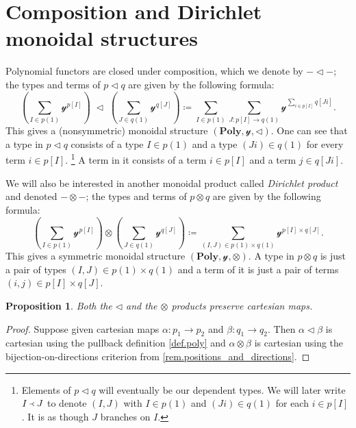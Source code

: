 \documentclass[11pt, one side, article]{memoir}
\theoremstyle{definition}
\theoremstyle{plain}
\newtheorem{proposition}[definitionx]{Proposition}
\newcommand{\Cat}[1]{\mathbf{#1}}%
\newcommand{\yon}{\mathcal{y}}
\newcommand{\poly}{\Cat{Poly}}
\newcommand{\0}{\textsf{0}}
\newcommand{\1}{\tn{\textsf{1}}}
\newcommand{\tri}{\mathbin{\triangleleft}}
\newcommand{\founds}{\Yleft}
\begin{document}
\section{Composition and Dirichlet monoidal structures}

Polynomial functors are closed under composition, which we denote by $-\tri-$; the types and terms of $p\tri q$ are given by the following formula:
\begin{equation}\label{eqn.comp_formula}
  \left(\sum_{I\in p(1)}\yon^{p[I]}\right)\;\tri\;
  \left(\sum_{J\in q(1)}\yon^{q[J]}\right)\coloneqq
  \sum_{I\in p(1)}\sum_{J\colon p[I]\to q(1)}\yon^{\sum_{i\in p[I]}q[J i]}.
\end{equation}
This gives a (nonsymmetric) monoidal structure $(\poly,\yon,\tri)$. One can see that a type in $p\tri q$ consists of a type $I\in p(1)$ and a type $(J i)\in q(1)$ for every term $i\in p[I]$.%
\footnote{Elements of $p\tri q$ will eventually be our dependent types. We will later write $I\founds J$ to denote $(I,J)$ with $I\in p(1)$ and $(J i)\in q(1)$ for each $i\in p[I]$. It is as though $J$ branches on $I$.}
A term in it consists of a term $i\in p[I]$ and a term $j\in q[J i]$.

We will also be interested in another monoidal product called \emph{Dirichlet product} and denoted $-\otimes-$; the types and terms of $p\otimes q$ are given by the following formula:
\begin{equation}\label{eqn.dir_formula}
  \left(\sum_{I\in p(1)}\yon^{p[I]}\right)\otimes
  \left(\sum_{J\in q(1)}\yon^{q[J]}\right)\coloneqq
  \sum_{(I,J)\in p(1)\times q(1)}\yon^{p[I]\times q[J]}.
\end{equation}
This gives a symmetric monoidal structure $(\poly,\yon,\otimes)$. A type in $p\otimes q$ is just a pair of types $(I,J)\in p(1)\times q(1)$ and a term of it is just a pair of terms $(i,j)\in p[I]\times q[J]$.

\begin{proposition}\label{prop.tri_dir_cartesian}
Both the $\tri$ and the $\otimes$ products preserve cartesian maps.
\end{proposition}
\begin{proof}
Suppose given cartesian maps $\alpha\colon p_1\to p_2$ and $\beta\colon q_1\to q_2$. Then $\alpha\tri\beta$ is cartesian using the pullback definition \cref{def.poly} and $\alpha\otimes\beta$ is cartesian using the bijection-on-directions criterion from \cref{rem.positions_and_directions}.
\end{proof}
\end{document}
